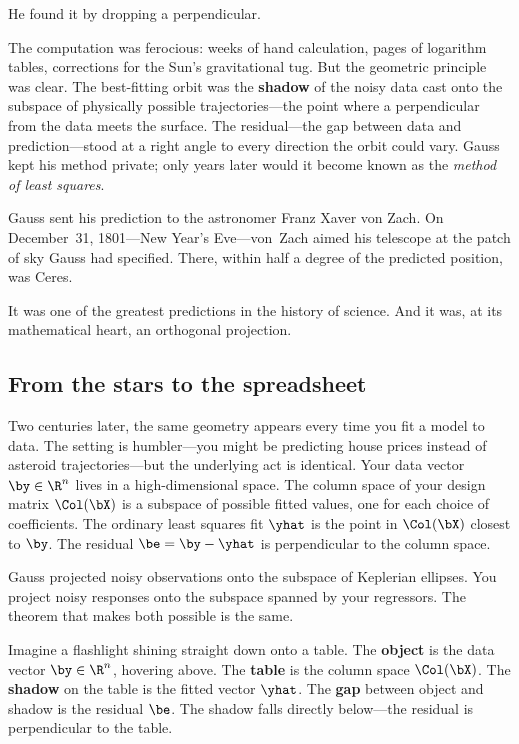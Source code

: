 He found it by dropping a perpendicular.

The computation was ferocious: weeks of hand calculation, pages of
logarithm tables, corrections for the Sun's gravitational tug.  But the
geometric principle was clear.  The best-fitting orbit was the
\textbf{shadow} of the noisy data cast onto the subspace of physically
possible trajectories---the point where a perpendicular from the data
meets the surface.  The residual---the gap between data and
prediction---stood at a right angle to every direction the orbit could
vary.  Gauss kept his method private; only years later would it become
known as the \emph{method of least squares}.

Gauss sent his prediction to the astronomer Franz Xaver von Zach.  On
December~31, 1801---New Year's Eve---von~Zach aimed his telescope at the
patch of sky Gauss had specified.  There, within half a degree of the
predicted position, was Ceres.

It was one of the greatest predictions in the history of science.
And it was, at its mathematical heart, an orthogonal projection.

\bigskip

\subsection*{From the stars to the spreadsheet}

Two centuries later, the same geometry appears every time you fit a
model to data.  The setting is humbler---you might be predicting house
prices instead of asteroid trajectories---but the underlying act is
identical.  Your data vector $\by\in\R^n$ lives in a high-dimensional
space.  The column space of your design matrix $\Col(\bX)$ is a subspace
of possible fitted values, one for each choice of coefficients.  The
ordinary least squares fit $\yhat$ is the point in $\Col(\bX)$ closest
to $\by$.  The residual $\be = \by - \yhat$ is perpendicular to the
column space.

Gauss projected noisy observations onto the subspace of Keplerian
ellipses.  You project noisy responses onto the subspace spanned by
your regressors.  The theorem that makes both possible is the same.

\begin{metaphor}
Imagine a flashlight shining straight down onto a table.
The \textbf{object} is the data vector $\by\in\R^n$, hovering above.
The \textbf{table} is the column space $\Col(\bX)$.
The \textbf{shadow} on the table is the fitted vector $\yhat$.
The \textbf{gap} between object and shadow is the residual $\be$.
The shadow falls directly below---the residual is
perpendicular to the table.
\end{metaphor}

